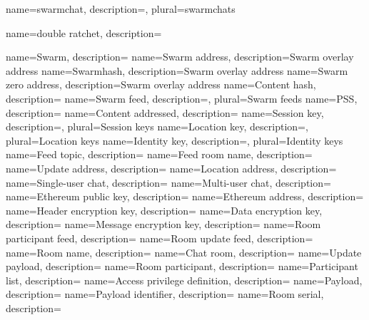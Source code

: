 {
	name={swarmchat},
	description={},
	plural={swarmchats}
}

{
	name={double ratchet},
	description={}
}

{
	name={Swarm},
	description={}
}
{
	name={Swarm address},
	description={Swarm overlay address}
}
{
	name={Swarmhash},
	description={Swarm overlay address}
}
{
	name={Swarm zero address},
	description={Swarm overlay address}
}
{
	name={Content hash},
	description={}
}
{
	name={Swarm feed},
	description={},
	plural={Swarm feeds}
}
{
	name={PSS},
	description={}
}
{
	name={Content addressed},
	description={}
}
{
	name={Session key},
	description={},
	plural={Session keys}
}
{
	name={Location key},
	description={},
	plural={Location keys}
}
{
	name={Identity key},
	description={},
	plural={Identity keys}
}
{
	name={Feed topic},
	description={}
}
{
	name={Feed room name},
	description={}
}
{
	name={Update address},
	description={}
}
{
	name={Location address},
	description={}
}
{
	name={Single-user chat},
	description={}
}
{
	name={Multi-user chat},
	description={}
}
{
	name={Ethereum public key},
	description={}
}
{
	name={Ethereum address},
	description={}
}
{
	name={Header encryption key},
	description={}
}
{
	name={Data encryption key},
	description={}
}
{
	name={Message encryption key},
	description={}
}
{
	name={Room participant feed},
	description={}
}
{
	name={Room update feed},
	description={}
}
{
	name={Room name},
	description={}
}
{
	name={Chat room},
	description={}
}
{
	name={Update payload},
	description={}
}
{
	name={Room participant},
	description={}
}
{
	name={Participant list},
	description={}
}
{
	name={Access privilege definition},
	description={}
}
{
	name={Payload},
	description={}
}
{
	name={Payload identifier},
	description={}
}
{
	name={Room serial},
	description={}
}
